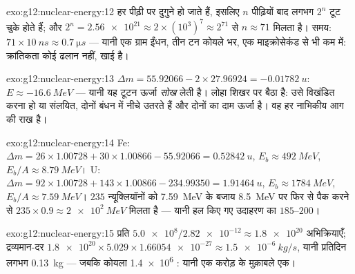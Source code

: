 \begin{solution}{exo:g12:nuclear-energy:12}
 हर पीढ़ी पर दुगुने हो जाते हैं, इसलिए $n$ पीढ़ियों बाद लगभग
$2^n$ टूट चुके होते हैं; और $2^{n} = \num{2.56e21} \approx 2 \times (10^{3})^{7}
\approx 2^{71}$ से $n \approx 71$ मिलता है। समय: $71 \times \qty{10}{ns}
\approx \qty{0.7}{\micro s}$ --- यानी
एक ग्राम ईंधन, तीन टन कोयले भर, एक माइक्रोसेकंड से भी कम में: क्रांतिकता कोई
ढलान नहीं, खाई है।
\end{solution}

\begin{solution}{exo:g12:nuclear-energy:13}
$\Delta m = 55.92066 - 2 \times 27.96924 = \qty{-0.01782}{u}$: $E \approx \qty{-16.6}{MeV}$ --- यानी यह टूटन ऊर्जा \emph{सोख} लेती है। लोहा शिखर पर
बैठा है: उसे विखंडित करना हो या संलयित, दोनों बंधन में नीचे उतरते हैं और दोनों
का दाम ऊर्जा है। वह हर नाभिकीय आग की राख है।
\end{solution}

\begin{solution}{exo:g12:nuclear-energy:14}
Fe: $\Delta m = 26 \times 1.00728 + 30 \times 1.00866 - 55.92066 =
\qty{0.52842}{u}$, $E_b \approx \qty{492}{MeV}$, $E_b/A \approx
\qty{8.79}{MeV}$। U: $\Delta m = 92 \times 1.00728 + 143 \times
1.00866 - 234.99350 = \qty{1.91464}{u}$, $E_b \approx \qty{1784}{MeV}$, $E_b/A \approx \qty{7.59}{MeV}$। $235$
न्यूक्लियॉनों को \qty{7.59}{MeV} के बजाय \qty{8.5}{MeV} पर फिर से पैक करने से $235 \times 0.9
\approx \qty{2e2}{MeV}$
मिलता है --- यानी हल किए गए उदाहरण का $185$--$200$।
\end{solution}

\begin{solution}{exo:g12:nuclear-energy:15}
प्रति  $\num{5.0e8}/\num{2.82e-12} \approx \num{1.8e20}$ अभिक्रियाएँ; द्रव्यमान-दर $\num{1.8e20} \times 5.029 \times \num{1.66054e-27}
\approx \qty{1.5e-6}{kg/s}$, यानी प्रतिदिन लगभग
\qty{0.13}{kg} --- जबकि कोयला \num{1.4e6} : यानी एक करोड़ के मुक़ाबले एक।
\end{solution}

